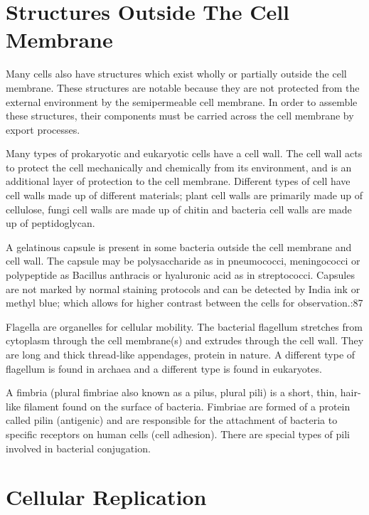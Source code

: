 \hypertarget{structures-outside-the-cell-membrane}{%
\section{Structures Outside The Cell Membrane}\label{structures-outside-the-cell-membrane}}

Many cells also have structures which exist wholly or partially outside the cell membrane. These structures are notable because they are not protected from the external environment by the semipermeable cell membrane. In order to assemble these structures, their components must be carried across the cell membrane by export processes.

Many types of prokaryotic and eukaryotic cells have a cell wall. The cell wall acts to protect the cell mechanically and chemically from its environment, and is an additional layer of protection to the cell membrane. Different types of cell have cell walls made up of different materials; plant cell walls are primarily made up of cellulose, fungi cell walls are made up of chitin and bacteria cell walls are made up of peptidoglycan.

A gelatinous capsule is present in some bacteria outside the cell membrane and cell wall. The capsule may be polysaccharide as in pneumococci, meningococci or polypeptide as Bacillus anthracis or hyaluronic acid as in streptococci. Capsules are not marked by normal staining protocols and can be detected by India ink or methyl blue; which allows for higher contrast between the cells for observation.:87

Flagella are organelles for cellular mobility. The bacterial flagellum stretches from cytoplasm through the cell membrane(s) and extrudes through the cell wall. They are long and thick thread-like appendages, protein in nature. A different type of flagellum is found in archaea and a different type is found in eukaryotes.

A fimbria (plural fimbriae also known as a pilus, plural pili) is a short, thin, hair-like filament found on the surface of bacteria. Fimbriae are formed of a protein called pilin (antigenic) and are responsible for the attachment of bacteria to specific receptors on human cells (cell adhesion). There are special types of pili involved in bacterial conjugation.

\hypertarget{cellular-replication}{%
\section{Cellular Replication}\label{cellular-replication}}

